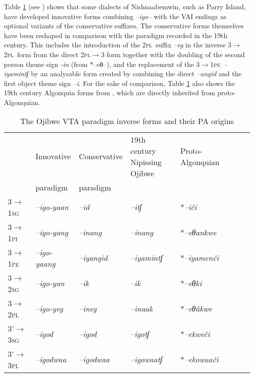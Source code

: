 \documentclass[twoside,a4paper,11pt]{article}
\newcommand{\ipa}[1]{{\phon\textit{#1}}}
\newcommand{\sg}{\textsc{sg}}
\newcommand{\pl}{\textsc{pl}}
\newcommand{\grise}[1]{\cellcolor{lightgray}\textbf{#1}}
\newcommand{\Σ}{\greek{Σ}}
\newcommand{\pli}{\textsc{pi}}
\newcommand{\pe}{\textsc{pe}}
\begin{document}
 Table \ref{tab:ojibwe.vta.2} (see \citealt[178-9]{valentine01grammar})  shows that some dialects of Nishnaabemwin,  such as Parry Island, have developed  innovative forms combining \ipa{--igo--} with the VAI endings as optional variants of the conservative suffixes. The conservative forms themselves have been reshaped in comparison with the paradigm recorded in the 19th century. This includes the introduction of the 2\pl\ suffix \ipa{--eg} in the inverse 3$\rightarrow$2\pl\ form from the direct 2\pl$\rightarrow$3 form together with the doubling of the second person theme sign \ipa{-in} (from *--eθ--), and the replacement of the 3$\rightarrow$1\pe\  \ipa{--iyamintʃ}  by an analysable form created by combining the direct \ipa{--angid} and the first object theme sign \ipa{--i}. For the sake of comparison,  Table \ref{tab:ojibwe.vta.2} also shows the 19th century Algonquin forms from \citet[51]{cuoq1866}, which are directly inherited from proto-Algonquian.

\begin{table}[H]
\caption{The Ojibwe VTA paradigm inverse forms and their PA origins}
\centering \label{tab:ojibwe.vta.2}
\begin{tabular}{llllllll}
\toprule
& Innovative & Conservative & 19th century Nipissing Ojibwe & Proto-Algonquian \\
&paradigm & paradigm&\\
\midrule
3$\rightarrow$1\sg &\ipa{--igo-yaan} \grise{}& 	\ipa{--id} & \ipa{--itʃ} &	 *\ipa{--iči} & 		\\
3$\rightarrow$1\pli & 	\ipa{--igo-yang} \grise{}& 	\ipa{--inang} &  	\ipa{--inang}  	 &*\ipa{--eθankwe} & 		\\
3$\rightarrow$1\pe & 	\ipa{--igo-yaang} \grise{}& 	\ipa{--iyangid} \grise{}&	\ipa{--iyamintʃ}  &  *\ipa{--iyamenči} & 		\\
\midrule
3$\rightarrow$2\sg & 	\ipa{--igo-yan} \grise{}& 	\ipa{--ik} &	\ipa{--ik} &  *\ipa{--eθki} & 		\\
3$\rightarrow$2\pl & \ipa{--igo-yeg} \grise{}& 	\ipa{--ineg}  \grise{} & \ipa{--inaak}  & *\ipa{--eθâkwe} & 		\\
\midrule
3'$\rightarrow$3\sg & \ipa{--igod} & 	\ipa{--igod} &		\ipa{--igotʃ} &*\ipa{--ekweči} & 		\\
3'$\rightarrow$3\pl & \ipa{--igodwaa}   & 	\ipa{--igodwaa}  \grise{}&\ipa{--igowaatʃ} &*\ipa{--ekowaači} & 		\\
\bottomrule
\end{tabular}
\end{table}
\end{document}
